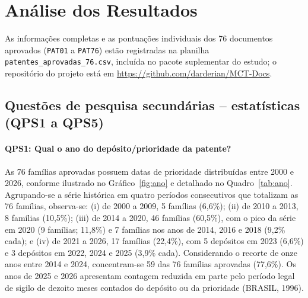 \documentclass[12pt,a4paper]{article}
\begin{document}
\section{Análise dos Resultados}

As informações completas e as pontuações individuais dos 76 documentos aprovados (\texttt{PAT01} a \texttt{PAT76}) estão registradas na planilha \texttt{patentes\_aprovadas\_76.csv}, incluída no pacote suplementar do estudo; o repositório do projeto está em \url{https://github.com/darderian/MCT-Docs}.

\subsection{Questões de pesquisa secundárias -- estatísticas (QPS1 a QPS5)}

\paragraph{QPS1: Qual o ano do depósito/prioridade da patente?}
As 76 famílias aprovadas possuem datas de prioridade distribuídas entre 2000 e 2026, conforme ilustrado no Gráfico~\ref{fig:ano} e detalhado no Quadro~\ref{tab:ano}. Agrupando-se a série histórica em quatro períodos consecutivos que totalizam as 76 famílias, observa-se: (i) de 2000 a 2009, 5 famílias (6,6\%); (ii) de 2010 a 2013, 8 famílias (10,5\%); (iii) de 2014 a 2020, 46 famílias (60,5\%), com o pico da série em 2020 (9 famílias; 11,8\%) e 7 famílias nos anos de 2014, 2016 e 2018 (9,2\% cada); e (iv) de 2021 a 2026, 17 famílias (22,4\%), com 5 depósitos em 2023 (6,6\%) e 3 depósitos em 2022, 2024 e 2025 (3,9\% cada). Considerando o recorte de onze anos entre 2014 e 2024, concentram-se 59 das 76 famílias aprovadas (77,6\%). Os anos de 2025 e 2026 apresentam contagem reduzida em parte pelo período legal de sigilo de dezoito meses contados do depósito ou da prioridade (BRASIL, 1996).
\end{document}
